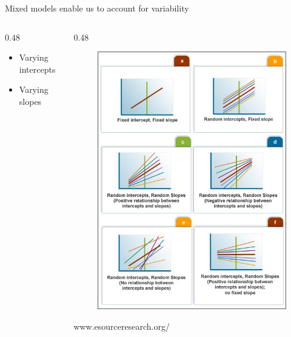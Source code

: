 \documentclass[10pt,ignorenonframetext,]{beamer}
\def\begincols{\begin{columns}[c]}
\def\endcols{\end{columns}}
\def\begincol{\begin{column}{0.48\textwidth}}
\def\endcol{\end{column}}
\begin{document}
\begin{frame}{Mixed models enable us to account for variability}

\begincols

\begincol

\begin{itemize}[<+->]
\item
  Varying intercepts
\item
  Varying slopes
\end{itemize}

\endcol

\begincol

\begin{figure}[htbp]
\centering
\includegraphics{images/mixed_models.jpg}
\caption{}
\end{figure}

www.esourceresearch.org/

\endcol

\endcols

\end{frame}
\end{document}
